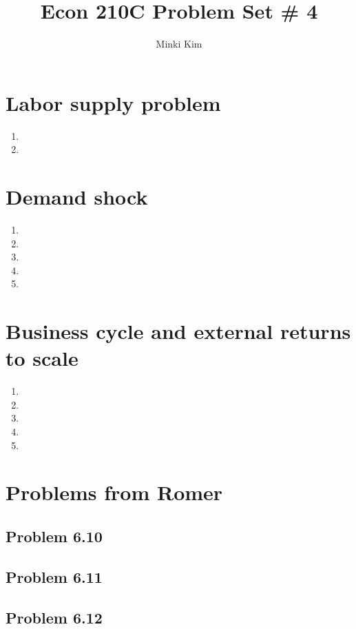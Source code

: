 \documentclass[11pt]{amsart}
\title{Econ 210C Problem Set \# 4}
\author{Minki Kim}
\begin{document}
\maketitle

\section{Labor supply problem}
\begin{enumerate}[label=(\alph*)]
	\item 
	\item
\end{enumerate}
\section{Demand shock}
\begin{enumerate}[label=(\alph*)]
	\item 
	\item
	\item
	\item
	\item
\end{enumerate}
\section{Business cycle and external returns to scale}
\begin{enumerate}[label=(\alph*)]
	\item 
	\item
	\item
	\item
	\item
\end{enumerate}
\section{Problems from Romer}
\subsection{Problem 6.10}
\subsection{Problem 6.11}
\subsection{Problem 6.12}
\end{document}
